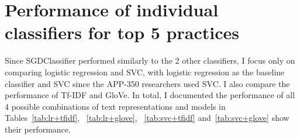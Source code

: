 \section{Performance of individual classifiers for top 5 practices}
Since SGDClassifier performed similarly to the 2 other classifiers, I focus only on comparing logistic regression and SVC, with logistic regression as the baseline classifier and SVC since the APP-350 researchers used SVC. I also compare the performance of Tf-IDF and GloVe. In total, I documented the performance of all 4 possible combinations of text representations and models in Tables~\ref{tab:lr+tfidf}, ~\ref{tab:lr+glove}, ~\ref{tab:svc+tfidf} and~\ref{tab:svc+glove} show their performance.

\begin{table}[!ht]
\end{table}
